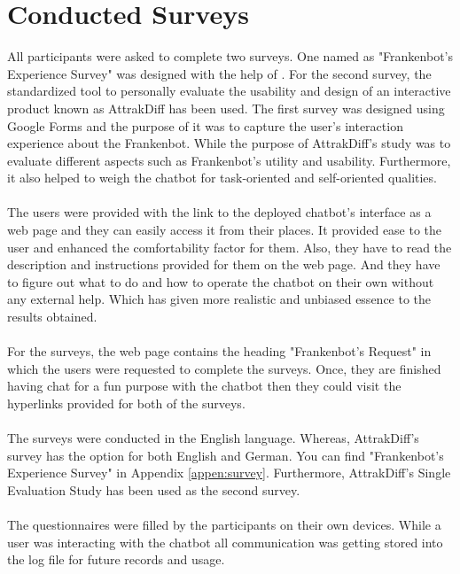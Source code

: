\section{Conducted Surveys}
All participants were asked to complete two surveys. One named as "Frankenbot's Experience Survey" was designed with the help of \cite{evaluatingSpokDialSys}\cite{itut}. For the second survey, the standardized tool to personally evaluate the usability and design of an interactive product known as AttrakDiff \cite{attrakdiff} has been used. The first survey was designed using Google Forms and the purpose of it was to capture the user's interaction experience about the Frankenbot. While the purpose of AttrakDiff's study was to evaluate different aspects such as Frankenbot's utility and usability. Furthermore, it also helped to weigh the chatbot for task-oriented and self-oriented qualities. 
\\~\\
The users were provided with the link to the deployed chatbot's interface as a web page and they can easily access it from their places. It provided ease to the user and enhanced the comfortability factor for them. Also, they have to read the description and instructions provided for them on the web page. And they have to figure out what to do and how to operate the chatbot on their own without any external help. Which has given more realistic and unbiased essence to the results obtained.
\\~\\
For the surveys, the web page contains the heading "Frankenbot's Request" in which the users were requested to complete the surveys. Once, they are finished having chat for a fun purpose with the chatbot then they could visit the hyperlinks provided for both of the surveys.
\\~\\
The surveys were conducted in the English language. Whereas, AttrakDiff's survey has the option for both English and German. You can find "Frankenbot's Experience Survey" in Appendix \ref{appen:survey}. Furthermore, AttrakDiff's Single Evaluation Study\cite{indeval} has been used as the second survey.
\\~\\
The questionnaires were filled by the participants on their own devices. While a user was interacting with the chatbot all communication was getting stored into the log file for future records and usage.

